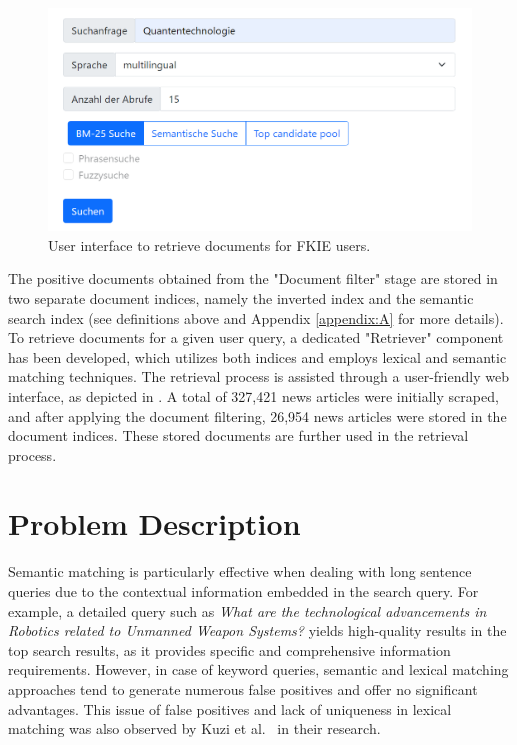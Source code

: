 \begin{figure}[h]
	\centering
	\includegraphics[width=.7\textwidth]{images/mitera_screenshots/newsfeeds_search.PNG}
	\caption[Search user interface.]{User interface to retrieve documents for FKIE users. \label{fig:mitera_search}}
\end{figure}

The positive documents obtained from the "Document filter" stage are stored in two separate document indices, namely the inverted index and the semantic search index (see definitions above and Appendix \ref{appendix:A} for more details). To retrieve documents for a given user query, a dedicated "Retriever" component has been developed, which utilizes both indices and employs lexical and semantic matching techniques. The retrieval process is assisted through a user-friendly web interface, as depicted in . A total of 327,421 news articles were initially scraped, and after applying the document filtering, 26,954 news articles were stored in the document indices. These stored documents are further used in the retrieval process.


\section{Problem Description}

Semantic matching is particularly effective when dealing with long sentence queries due to the contextual information embedded in the search query. For example, a detailed query such as \textit{What are the technological advancements in Robotics related to Unmanned Weapon Systems?} yields high-quality results in the top search results, as it provides specific and comprehensive information requirements. However, in case of keyword queries, semantic and lexical matching approaches tend to generate numerous false positives and offer no significant advantages. This issue of false positives and lack of uniqueness in lexical matching was also observed by Kuzi et al.~\cite{kuzi2020leveraging} in their research.


